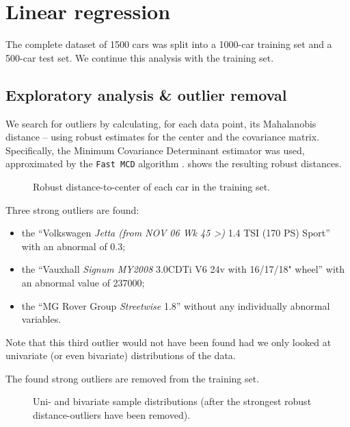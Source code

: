 \documentclass[a4paper, 12pt]{article}
\newcommand{\varr}[1]{\texttt{\StrSubstitute{#1}{ }{\_\allowbreak}}}
\newcommand{\car}[3]{``#1 \textit{#2} #3''}
\newcommand{\wide}[1]{\makebox[\textwidth][c]{#1}%
}
\newcommand{\widefig}[1]{\wide{\texttt{[image: \#1]}}}
\begin{document}



\section{Linear regression}

The complete dataset of 1500 cars was split into a 1000-car training set and a 500-car test set. We continue this analysis with the training set.

\subsection*{Exploratory analysis \& outlier removal}
\label{sec:RD_outlier_removal}

We search for outliers by calculating, for each data point, its Mahalanobis distance -- using robust estimates for the center and the covariance matrix. Specifically, the Minimum Covariance Determinant estimator \cite{mcd} was used, approximated by the \texttt{Fast MCD} algorithm \cite{fastmcd}.  shows the resulting robust distances.

\begin{figure}%
  \widefig{fig/multivar_outlier_all}
  \vspace{1mm} \newline
  \widefig{fig/multivar_outlier_zoom}
  \caption{Robust distance-to-center of each car in the training set.}
  \label{fig:RD_outliers}
\end{figure}

Three strong outliers are found:
\begin{itemize}[topsep=0pt,itemsep=0pt]
  \item the \car{Volkswagen}{Jetta (from NOV 06 Wk 45 >)}{1.4 TSI (170 PS) Sport} with an abnormal \varr{noise level} of 0.3;
  \item the \car{Vauxhall}{Signum MY2008}{3.0CDTi V6 24v with 16/17/18" wheel} with an abnormal \varr{nox emissions} value of 237000;
  \item the \car{MG Rover Group}{Streetwise}{1.8} without any individually abnormal variables.
\end{itemize}
Note that this third outlier would not have been found had we only looked at univariate (or even bivariate) distributions of the data.

The found strong outliers are removed from the training set.


\begin{figure}%
  \widefig{fig/pairs.pdf}
  \caption{Uni- and bivariate sample distributions (after the strongest robust distance-outliers have been removed).}
  \label{fig:pairs}
\end{figure}
\end{document}
